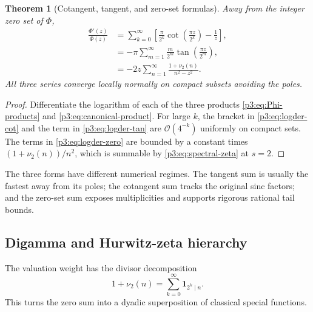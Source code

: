 \documentclass[11pt]{article}
\newtheorem{theorem}{Theorem}[section]
\theoremstyle{definition}
\theoremstyle{remark}
\newcommand{\bigO}{\mathcal O}
\newcommand{\one}{\mathbf 1}
\begin{document}
\begin{theorem}[Cotangent, tangent, and zero-set formulas]\label{p3:thm:three-logder}
Away from the integer zero set of \(\Phi\),
\begin{align}
 \frac{\Phi'(z)}{\Phi(z)}
 &=\sum_{k=0}^{\infty}
 \left[
 \frac{\pi}{2^k}\cot\!\left(\frac{\pi z}{2^k}\right)-\frac1z
 \right],                                                    \label{p3:eq:logder-cot}\\
 &=-\pi\sum_{m=1}^{\infty}\frac{m}{2^m}
 \tan\!\left(\frac{\pi z}{2^m}\right),                    \label{p3:eq:logder-tan}\\
 &=-2z\sum_{n=1}^{\infty}\frac{1+\nu_2(n)}{n^2-z^2}.       \label{p3:eq:logder-zero}
\end{align}
All three series converge locally normally on compact subsets avoiding the poles.
\end{theorem}

\begin{proof}
Differentiate the logarithm of each of the three products
\eqref{p3:eq:Phi-products} and \eqref{p3:eq:canonical-product}.  For large \(k\), the bracket
in \eqref{p3:eq:logder-cot} and the term in \eqref{p3:eq:logder-tan} are \(\bigO(4^{-k})\)
uniformly on compact sets.  The terms in \eqref{p3:eq:logder-zero} are bounded by a constant
times \((1+\nu_2(n))/n^2\), which is summable by \eqref{p3:eq:spectral-zeta} at \(s=2\).
\end{proof}

The three forms have different numerical regimes.  The tangent sum is usually the fastest
away from its poles; the cotangent sum tracks the original sinc factors; and the zero-set
sum exposes multiplicities and supports rigorous rational tail bounds.

\subsection{Digamma and Hurwitz-zeta hierarchy}

The valuation weight has the divisor decomposition
\begin{equation}
 1+\nu_2(n)=\sum_{k=0}^{\infty}\one_{2^k\mid n}.             \label{p3:eq:valuation-indicators}
\end{equation}
This turns the zero sum into a dyadic superposition of classical special functions.
\end{document}
